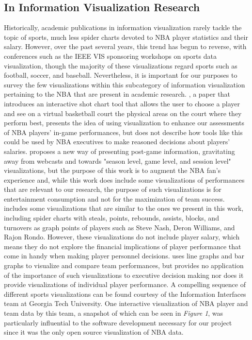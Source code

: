 \documentclass[journal]{vgtc}                %
\begin{document}
\subsection{In Information Visualization Research}
Historically, academic publications in information visualization rarely tackle the topic of sports, much less spider charts devoted to NBA player statistics and their salary. However, over the past several years, this trend has begun to reverse, with conferences such as the IEEE VIS sponsoring workshops on sports data visualization, though the majority of these visualizations regard sports such as football, soccer, and baseball. Nevertheless, it is important for our purposes to survey the few visualizations within this subcategory of information visualization pertaining to the NBA that are present in academic research. \cite{chu}, a paper that introduces an interactive shot chart tool that allows the user to choose a player and see on a virtual basketball court the physical areas on the court where they perform best, presents the idea of using visualization to enhance our assessments of NBA players' in-game performances, but does not describe how tools like this could be used by NBA executives to make reasoned decisions about players' salaries. \cite{chen} proposes a new way of presenting post-game information, gravitating away from webcasts and towards "season level, game level, and session level" visualizations, but the purpose of this work is to augment the NBA fan's experience and, while this work does include some visualizations of performances that are relevant to our research, the purpose of such visualizations is for entertainment consumption and not for the maximization of team success. \cite{pagno} includes some visualizations that are similar to the ones we present in this work, including spider charts with steals, points, rebounds, assists, blocks, and turnovers as graph points of players such as Steve Nash, Deron Williams, and Rajon Rondo. However, these visualizations do not include player salary, which means they do not explore the financial implications of player performance that come in handy when making player personnel decisions. \cite{reyna} uses line graphs and bar graphs to visualize and compare team performances, but provides no application of the importance of such visualizations to executive decision making nor does it provide visualizations of individual player performance. A compelling sequence of different sports visualizations can be found courtesy of the Information Interfaces team at Georgia Tech University. One interactive visualization of NBA player and team data by this team, a snapshot of which can be seen in \emph{Figure 1}, was particularly influential to the software development necessary for our project since it was the only open source visualization of NBA data.
\end{document}
